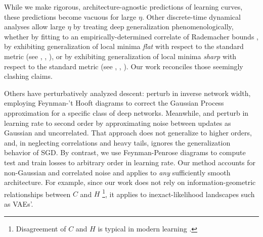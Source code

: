 \documentclass{article}
\theoremstyle{plain}
\theoremstyle{definition}
\begin{document}

    While we make rigorous, architecture-agnostic predictions of learning
    curves, these predictions become vacuous for large $\eta$.  Other
    discrete-time dynamical analyses allow large $\eta$ by treating deep
    generalization phenomenologically, whether by fitting to an
    empirically-determined correlate of Rademacher bounds \citep{li18}, by
    exhibiting generalization of local minima \emph{flat} with respect to the
    standard metric (see \citet{ho17}, \citet{ke17}, \citet{wa18}), or by
    exhibiting generalization of local minima \emph{sharp} with respect to the
    standard metric (see \citet{st56}, \citet{di17}, \citet{wu18}).  Our work
    reconciles those seemingly clashing claims.
    

    Others have perturbatively analyzed descent:  \citet{dy19} perturb
    in inverse network width, employing Feynman-'t Hooft diagrams to correct
    the Gaussian Process approximation for a specific class of deep networks.
    Meanwhile, \cite{ch18} and \citet{li17} perturb in learning rate to second
    order by approximating noise between updates as Gaussian and uncorrelated.
    That approach does not generalize to higher orders, and, in neglecting
    correlations and heavy tails, ignores the generalization behavior of SGD.
    By contrast, we use Feynman-Penrose diagrams to compute test and train
    losses to arbitrary order in learning rate.  Our method accounts for
    non-Gaussian and correlated noise and applies to \emph{any} sufficiently
    smooth architecture.  For example, since our work does not rely on
    information-geometric relationships between $C$ and $H$
    \citep{am98}\footnote{
        Disagreement of $C$ and $H$ is typical in modern learning \citep{ro12,
        ku19}.
    }, it applies to inexact-likelihood landscapes such as VAEs'. 

\end{document}
